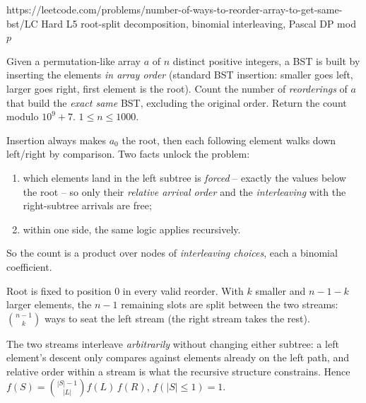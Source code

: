   {https://leetcode.com/problems/number-of-ways-to-reorder-array-to-get-same-bst/}{LC Hard L5}
  {root-split decomposition, binomial interleaving, Pascal DP mod $p$}

\begin{problemstatement}
Given a permutation-like array $a$ of $n$ distinct positive integers, a BST is built by
inserting the elements \emph{in array order} (standard BST insertion: smaller goes left,
larger goes right, first element is the root). Count the number of \emph{reorderings} of
$a$ that build the \emph{exact same} BST, excluding the original order. Return the count
modulo $10^9+7$. $1 \le n \le 1000$.
\end{problemstatement}

Insertion always makes $a_0$ the root, then each following element walks down left/right
by comparison. Two facts unlock the problem:
\begin{enumerate}[nosep]
  \item which elements land in the left subtree is \emph{forced} -- exactly the values
        below the root -- so only their \emph{relative arrival order} and the
        \emph{interleaving} with the right-subtree arrivals are free;
  \item within one side, the same logic applies recursively.
\end{enumerate}
So the count is a product over nodes of \emph{interleaving choices}, each a binomial
coefficient.

\begin{observation}
Root is fixed to position $0$ in every valid reorder. With $k$ smaller and $n-1-k$
larger elements, the $n-1$ remaining slots are split between the two streams:
$\binom{n-1}{k}$ ways to seat the left stream (the right stream takes the rest).
\end{observation}
\begin{observation}
The two streams interleave \emph{arbitrarily} without changing either subtree: a left
element's descent only compares against elements already on the left path, and relative
order within a stream is what the recursive structure constrains. Hence
$f(S) = \binom{|S|-1}{|L|} f(L)\,f(R)$, $f(|S|\le 1) = 1$.
\end{observation}

